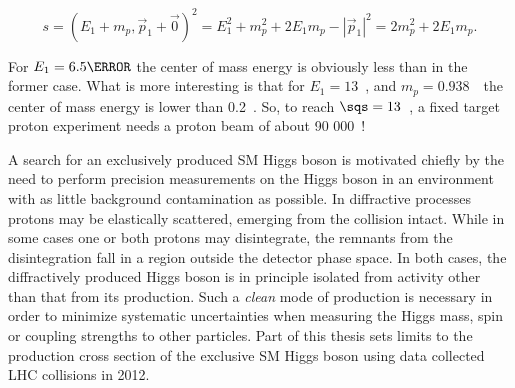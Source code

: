 \begin{equation}
s = (E_1 + m_p, \vec{p}_1 + \vec{0})^2 = E_1^2 + m_p^2 + 2E_1m_p - |\vec{p}_1|^2
= 2m_p^2 + 2E_1m_p. 
\end{equation} 

For $E_1=6.5\TeV$ the center of mass energy is obviously less than in the former case. 
What is more interesting is that for $E_1=13$~\TeV, and $m_p=0.938$~\GeV\ the center of mass 
energy is lower than 0.2~\TeV. So, to reach $\sqs=13$~\TeV, a fixed target proton experiment needs
a proton beam of about 90 000~\TeV!

\par A search for an exclusively produced SM Higgs boson is motivated chiefly by the need 
to perform precision measurements on the Higgs boson in an environment with as little background 
contamination as possible. In diffractive processes protons may be elastically scattered, emerging 
from the collision intact. While in some cases one or both protons may disintegrate, the remnants 
from the disintegration fall in a region outside the detector phase space. In both cases, the 
diffractively produced Higgs boson is in principle isolated from activity other than that from its 
production. Such a {\it clean} mode of production is necessary in order to minimize systematic 
uncertainties when measuring the Higgs mass, spin or coupling strengths to other particles.  
Part of this thesis sets limits to the production cross section of the exclusive SM Higgs boson using data 
collected LHC collisions in 2012.  

